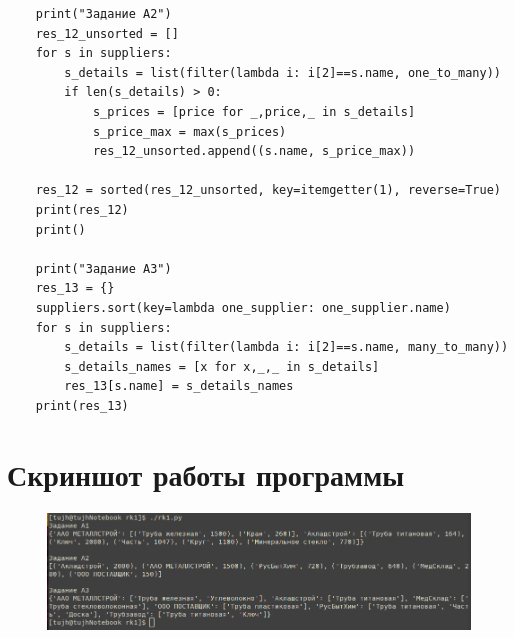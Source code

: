 \documentclass[a4paper]{report}
\begin{document}
\begin{verbatim}
	print("Задание A2")
	res_12_unsorted = []
	for s in suppliers:
		s_details = list(filter(lambda i: i[2]==s.name, one_to_many))
		if len(s_details) > 0:
			s_prices = [price for _,price,_ in s_details]
			s_price_max = max(s_prices)
			res_12_unsorted.append((s.name, s_price_max))

	res_12 = sorted(res_12_unsorted, key=itemgetter(1), reverse=True)
	print(res_12)
	print()
	
	print("Задание А3")
	res_13 = {}
	suppliers.sort(key=lambda one_supplier: one_supplier.name)
	for s in suppliers:
		s_details = list(filter(lambda i: i[2]==s.name, many_to_many))
		s_details_names = [x for x,_,_ in s_details]
		res_13[s.name] = s_details_names
	print(res_13)
\end{verbatim}

	\section*{Скриншот работы программы}
	\begin{figure}[h!]
		\centering
		\mbox{\includegraphics[scale=0.7]{1.png}}
	\end{figure}
	
\end{document}
